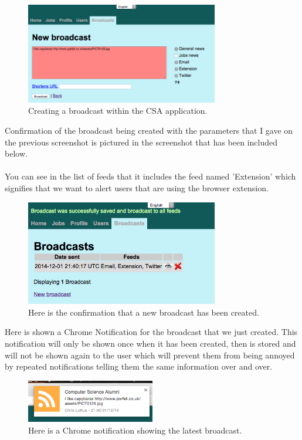 \documentclass{article}
\begin{document}
\begin{figure}[H]
\centering
\includegraphics[width=0.75\textwidth]{createbc}
\caption{Creating a broadcast within the CSA application.}
\end{figure}

\newpage
Confirmation of the broadcast being created with the parameters that I gave on the previous screenshot is pictured in the screenshot that has been included below.\\
\\
You can see in the list of feeds that it includes the feed named 'Extension' which signifies that we want to alert users that are using the browser extension.

\begin{figure}[H]
\centering
\includegraphics[width=0.75\textwidth]{confbc}
\caption{Here is the confirmation that a new broadcast has been created.}
\end{figure}

Here is shown a Chrome Notification for the broadcast that we just created. This notification will only be shown once when it has been created, then is stored and will not be shown again to the user which will prevent them from being annoyed by repeated notifications telling them the same information over and over.

\begin{figure}[H]
\centering
\includegraphics[width=0.5\textwidth]{chromenotification}
\caption{Here is a Chrome notification showing the latest broadcast.}
\end{figure}
\end{document}
